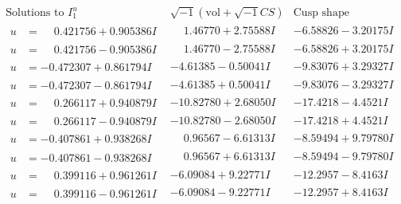 \documentclass[1p]{elsarticle_modified}
\theoremstyle{definition}
\newcommand{\I}{\sqrt{-1}}
\begin{document}
$$\begin{array}{c|c|c}  
\text{Solutions to }I^u_{1}& \I (\text{vol} + \sqrt{-1}CS) & \text{Cusp shape}\\
 \hline 
\begin{aligned}
u &= \phantom{-}0.421756 + 0.905386 I\end{aligned}
 & \phantom{-}1.46770 + 2.75588 I & -6.58826 - 3.20175 I \\ \hline\begin{aligned}
u &= \phantom{-}0.421756 - 0.905386 I\end{aligned}
 & \phantom{-}1.46770 - 2.75588 I & -6.58826 + 3.20175 I \\ \hline\begin{aligned}
u &= -0.472307 + 0.861794 I\end{aligned}
 & -4.61385 - 0.50041 I & -9.83076 + 3.29327 I \\ \hline\begin{aligned}
u &= -0.472307 - 0.861794 I\end{aligned}
 & -4.61385 + 0.50041 I & -9.83076 - 3.29327 I \\ \hline\begin{aligned}
u &= \phantom{-}0.266117 + 0.940879 I\end{aligned}
 & -10.82780 + 2.68050 I & -17.4218 - 4.4521 I \\ \hline\begin{aligned}
u &= \phantom{-}0.266117 - 0.940879 I\end{aligned}
 & -10.82780 - 2.68050 I & -17.4218 + 4.4521 I \\ \hline\begin{aligned}
u &= -0.407861 + 0.938268 I\end{aligned}
 & \phantom{-}0.96567 - 6.61313 I & -8.59494 + 9.79780 I \\ \hline\begin{aligned}
u &= -0.407861 - 0.938268 I\end{aligned}
 & \phantom{-}0.96567 + 6.61313 I & -8.59494 - 9.79780 I \\ \hline\begin{aligned}
u &= \phantom{-}0.399116 + 0.961261 I\end{aligned}
 & -6.09084 + 9.22771 I & -12.2957 - 8.4163 I \\ \hline\begin{aligned}
u &= \phantom{-}0.399116 - 0.961261 I\end{aligned}
 & -6.09084 - 9.22771 I & -12.2957 + 8.4163 I \\ \hline\begin{aligned}

\end{aligned}
\end{array}$$
\end{document}
